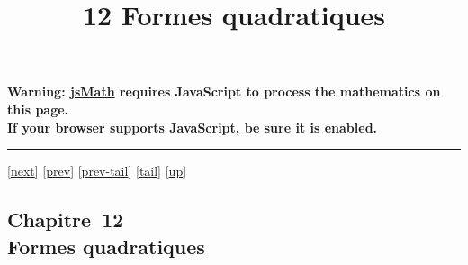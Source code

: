 \documentclass[]{article}
\title{12 Formes quadratiques}
\author{}
\date{}
\begin{document}
\maketitle

\textbf{Warning: \href{http://www.math.union.edu/locate/jsMath}{jsMath}
requires JavaScript to process the mathematics on this page.\\ If your
browser supports JavaScript, be sure it is enabled.}

\begin{center}\rule{3in}{0.4pt}\end{center}

{[}\href{coursch14.html}{next}{]} {[}\href{coursch12.html}{prev}{]}
{[}\href{coursch12.html\#tailcoursch12.html}{prev-tail}{]}
{[}\hyperref[tailcoursch13.html]{tail}{]}
{[}\href{cours.html\#coursch13.html}{up}{]}

\subsection{Chapitre~12\\Formes quadratiques}
\end{document}
